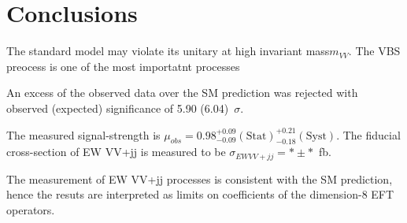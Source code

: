 \chapter{Conclusions}
\label{chap:conclusions}
The standard model may violate its unitary at high invariant mass{$m_{VV}$}.
The VBS preocess is one of the most importatnt processes 

An excess of the observed data over the SM prediction was rejected  with observed (expected) significance of 5.90 (6.04)~$\sigma$.

The measured signal-strength is $\mu_{obs} = 0.98^{+ 0.09}_{- 0.09}(\mathrm{Stat})^{+ 0.21}_{- 0.18}(\mathrm{Syst})$. 
The fiducial cross-section of EW VV+jj is measured to be $\sigma_{EW VV+jj} = * \pm * $~fb.

The measurement of EW VV+jj processes is consistent with the SM prediction, hence the resuts are interpreted as limits on coefficients of the dimension-8 EFT operators.






